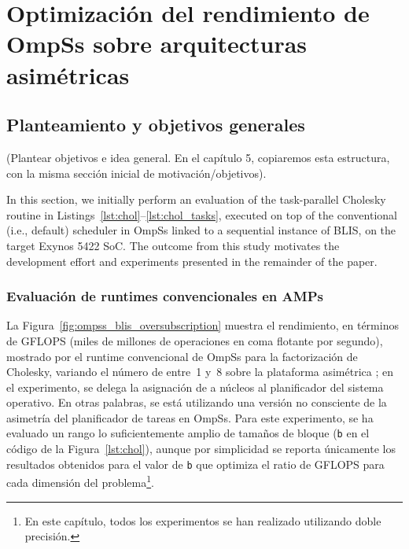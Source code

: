 \cleardoublepage

\chapter{Optimización del rendimiento de OmpSs sobre arquitecturas asimétricas}
\label{ch:chapter4}

%
%
%
%
\section{Planteamiento y objetivos generales}

(Plantear objetivos e idea general. En el capítulo 5, copiaremos esta estructura, con la
misma sección inicial de motivación/objetivos).

In this section, we initially perform an evaluation 
of the task-parallel Cholesky routine in Listings~\ref{lst:chol}--\ref{lst:chol_tasks},
executed on top of the conventional (i.e., default) scheduler in 
OmpSs linked to a sequential instance of BLIS,  on the target Exynos 5422 SoC.  The outcome from this study 
motivates the development effort and experiments presented in the remainder of the paper.

\subsection{Evaluación de runtimes convencionales en AMPs}

La Figura~\ref{fig:ompss_blis_oversubscription} muestra el rendimiento, en términos de GFLOPS (miles de millones de
operaciones en coma flotante por segundo), mostrado por el runtime convencional de OmpSs para la factorización
de Cholesky, variando el número de \wts entre~1 y~8 sobre la plataforma asimétrica \odroid; en el 
experimento, se delega la asignación de \wts a núcleos al planificador del sistema operativo. En otras palabras,
se está utilizando una versión no consciente de la asimetría del planificador de tareas en OmpSs.
Para este experimento, se ha evaluado un rango lo suficientemente amplio de tamaños de bloque 
({\tt b} en el código de la Figura~\ref{lst:chol}), aunque por simplicidad se reporta únicamente los
resultados obtenidos para el valor de {\tt b} que optimiza el ratio de GFLOPS para cada dimensión
del problema\footnote{En este capítulo, todos los experimentos se han realizado utilizando doble precisión.}.

